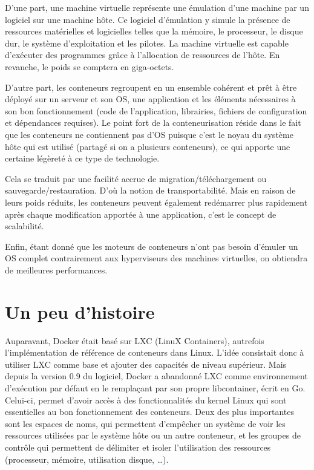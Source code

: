 \documentclass[oneside,12pt]{report}
\begin{document}
D'une part, une machine virtuelle représente une émulation d'une machine par un logiciel sur une machine hôte. Ce logiciel d'émulation y simule la présence de ressources matérielles et logicielles telles que la mémoire, le processeur, le disque dur, le système d'exploitation et les pilotes. La machine virtuelle est capable d'exécuter des programmes grâce à l'allocation de ressources de l'hôte. En revanche, le poids se comptera en giga-octets.\newline

D'autre part, les conteneurs regroupent en un ensemble cohérent et prêt à être déployé sur un serveur et son OS, une application et les éléments nécessaires à son bon fonctionnement (code de l'application, librairies, fichiers de configuration et dépendances requises). Le point fort de la conteneurisation réside dans le fait que les conteneurs ne contiennent pas d'OS puisque c'est le noyau du système hôte qui est utilisé (partagé si on a plusieurs conteneurs), ce qui apporte une certaine légèreté à ce type de technologie. \newline

Cela se traduit par une facilité accrue de migration/téléchargement ou sauvegarde/restauration. D’où la notion de transportabilité. Mais en raison de leurs poids réduits, les conteneurs peuvent également redémarrer plus rapidement après chaque modification apportée à une application, c'est le concept de scalabilité.\newline

Enfin, étant donné que les moteurs de conteneurs n'ont pas besoin d'émuler un OS complet contrairement aux hyperviseurs des machines virtuelles, on obtiendra de meilleures performances.

\section{Un peu d'histoire}

Auparavant, Docker était basé sur LXC (LinuX Containers), autrefois l'implémentation de référence de conteneurs dans Linux. L'idée consistait donc à utiliser LXC comme base et ajouter des capacités de niveau supérieur. Mais depuis la version 0.9 du logiciel, Docker a abandonné LXC comme environnement d'exécution par défaut en le remplaçant par son propre libcontainer, écrit en Go. Celui-ci, permet d'avoir accès à des fonctionnalités du kernel Linux qui sont essentielles au bon fonctionnement des conteneurs. Deux des plus importantes sont les espaces de noms, qui permettent d'empêcher un système de voir les ressources utilisées par le système hôte ou un autre conteneur, et les groupes de contrôle qui permettent de délimiter et isoler l'utilisation des ressources (processeur, mémoire, utilisation disque, …).
\end{document}
